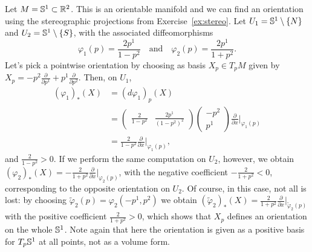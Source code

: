 \begin{example}\label{exe:orientsphere}
  Let $M = \mathbb{S}^1\subset \mathbb{R}^2$.
  This is an orientable manifold and we can find an orientation using the stereographic projections from Exercise~\ref{ex:stereo}.
  Let $U_1 = \mathbb{S}^1\setminus\{N\}$ and $U_2 = \mathbb{S}^1\setminus\{S\}$, with the associated diffeomorphisms
  \begin{equation}
    \varphi_1(p) = \frac{2p^1}{1-p^2}
    \quad\mbox{and}\quad
    \varphi_2(p) = \frac{2p^1}{1+p^2}.
  \end{equation}
  Let's pick a pointwise orientation by choosing as basis $X_p\in T_pM$ given by $X_p = -p^2 \frac{\partial}{\partial p^1} + p^1 \frac{\partial}{\partial p^2}$.
  Then, on $U_1$,
  \begin{align}
    (\varphi_1)_*(X) & = (d\varphi_1)_p(X)                                                \\
                     & = \left(\begin{smallmatrix}
                                   \frac{2}{1-p^2} & \frac{2p^1}{(1-p^2)^2}
                                 \end{smallmatrix}\right)
    \left(\begin{smallmatrix}
              -p^2 \\ p^1
            \end{smallmatrix}\right) \frac{\partial}{\partial x}\Big|_{\varphi_1(p)}        \\
                     & = \frac{2}{1-p^2} \frac{\partial}{\partial x}\Big|_{\varphi_1(p)},
  \end{align}
  and $\frac{2}{1-p^2}>0$.
  If we perform the same computation on $U_2$, however, we obtain $(\varphi_2)_*(X) = -\frac{2}{1+p^2}\frac{\partial}{\partial x}\Big|_{\varphi_2(p)}$, with the negative coefficient $-\frac{2}{1+p^2} < 0$, corresponding to the opposite orientation on $U_2$.
  Of course, in this case, not all is lost: by choosing $\widetilde\varphi_2(p) = \varphi_2(-p^1, p^2)$ we obtain $(\widetilde\varphi_2)_*(X) = \frac{2}{1+p^2} \frac{\partial}{\partial x}\Big|_{\widetilde\varphi_2(p)}$ with the positive coefficient $\frac{2}{1+p^2} > 0$, which shows that $X_p$ defines an orientation on the whole $\mathbb{S}^1$.
  Note again that here the orientation is given as a positive basis for $T_p \mathbb{S}^1$ at all points, not as a volume form.
\end{example}

